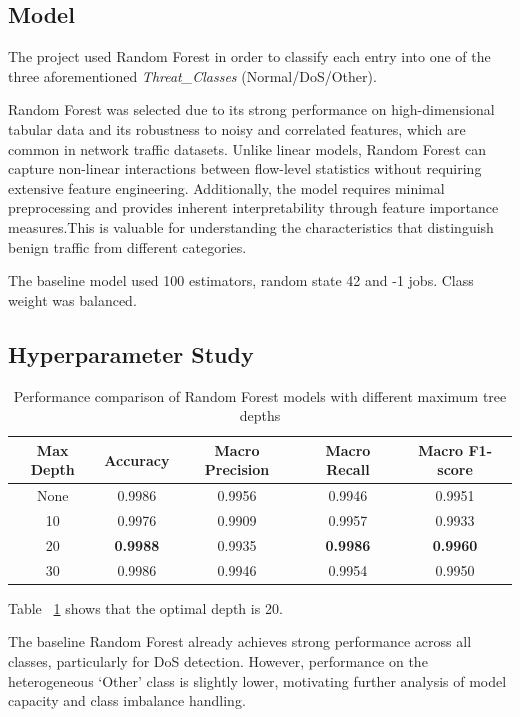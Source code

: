 \documentclass[conference]{IEEEtran}
\begin{document}
\subsection{Model}

The project used Random Forest in order to classify each entry into one of the three aforementioned \textit{Threat\_Classes} (Normal/DoS/Other).

Random Forest was selected due to its strong performance on high-dimensional tabular data and its robustness to noisy and correlated features, which are common in network traffic datasets. Unlike linear models, Random Forest can capture non-linear interactions between flow-level statistics without requiring extensive feature engineering. Additionally, the model requires minimal preprocessing and provides inherent interpretability through feature importance measures.This is valuable for understanding the characteristics that distinguish benign traffic from different categories. 

The baseline model used 100 estimators, random state 42 and -1 jobs. Class weight was balanced. 

\subsection{Hyperparameter Study}
\begin{table}[h]
\centering
\caption{Performance comparison of Random Forest models with different maximum tree depths}
\label{tab:max_depth_comparison}
\begin{tabular}{ccccc}
\toprule
Max Depth & Accuracy & Macro Precision & Macro Recall & Macro F1-score \\
\midrule
None & 0.9986 & 0.9956 & 0.9946 & 0.9951 \\
10   & 0.9976 & 0.9909 & 0.9957 & 0.9933 \\
20   & \textbf{0.9988} & 0.9935 & \textbf{0.9986} & \textbf{0.9960} \\
30   & 0.9986 & 0.9946 & 0.9954 & 0.9950 \\
\bottomrule
\end{tabular}
\end{table}

Table ~\ref{tab:max_depth_comparison} shows that the optimal depth is 20.

The baseline Random Forest already achieves strong performance across all classes, particularly for DoS detection. However, performance on the heterogeneous ‘Other’ class is slightly lower, motivating further analysis of model capacity and class imbalance handling.
\end{document}
